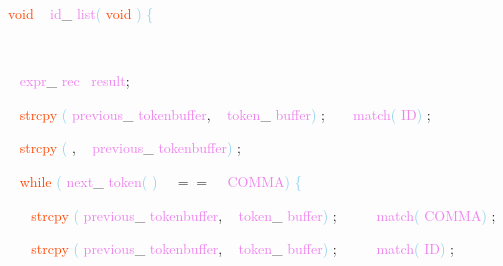\documentclass[8, usernames, dvipsnames]{beamer}
\begin{document}
\begin{frame}
\textcolor{OrangeRed}{void}
\textcolor{White}{\ }
\textcolor{Violet}{id}\textcolor{Sepia}{\_}
\textcolor{Violet}{list}\textcolor{SkyBlue}{(}
\textcolor{OrangeRed}{void}
\textcolor{SkyBlue}{)}
\textcolor{SkyBlue}{\{ }

 \textcolor{White}{\   }

 \textcolor{White}{\   }
\textcolor{Violet}{expr}\textcolor{Sepia}{\_}
\textcolor{Violet}{rec}\textcolor{White}{\ }
\textcolor{Violet}{result}\textcolor{Sepia}{;}

 \textcolor{White}{\   }
\textcolor{OrangeRed}{strcpy}
\textcolor{SkyBlue}{(}
\textcolor{Violet}{previous}\textcolor{Sepia}{\_}
\textcolor{Violet}{tokenbuffer}\textcolor{Sepia}{,}
\textcolor{White}{\ }
\textcolor{Violet}{token}\textcolor{Sepia}{\_}
\textcolor{Violet}{buffer}\textcolor{SkyBlue}{)}
\textcolor{Sepia}{;}
\textcolor{White}{\ }
\textcolor{White}{\   }
\textcolor{Violet}{match}\textcolor{SkyBlue}{(}
\textcolor{Violet}{ID}\textcolor{SkyBlue}{)}
\textcolor{Sepia}{;}

 \textcolor{White}{\   }
\textcolor{OrangeRed}{strcpy}
\textcolor{SkyBlue}{(}
\textcolor{Sepia}{,}
\textcolor{White}{\ }
\textcolor{Violet}{previous}\textcolor{Sepia}{\_}
\textcolor{Violet}{tokenbuffer}\textcolor{SkyBlue}{)}
\textcolor{Sepia}{;}

 \textcolor{White}{\   }
\textcolor{OrangeRed}{while}
\textcolor{SkyBlue}{(}
\textcolor{Violet}{next}\textcolor{Sepia}{\_}
\textcolor{Violet}{token}\textcolor{SkyBlue}{(}
\textcolor{SkyBlue}{)}
\textcolor{White}{\ }
\textcolor{OliveGreen}{$==$}
\textcolor{White}{\ }
\textcolor{Violet}{COMMA}\textcolor{SkyBlue}{)}
\textcolor{SkyBlue}{\{ }

 \textcolor{White}{\   }
\textcolor{White}{\   }
\textcolor{OrangeRed}{strcpy}
\textcolor{SkyBlue}{(}
\textcolor{Violet}{previous}\textcolor{Sepia}{\_}
\textcolor{Violet}{tokenbuffer}\textcolor{Sepia}{,}
\textcolor{White}{\ }
\textcolor{Violet}{token}\textcolor{Sepia}{\_}
\textcolor{Violet}{buffer}\textcolor{SkyBlue}{)}
\textcolor{Sepia}{;}
\textcolor{White}{\ }
\textcolor{White}{\   }
\textcolor{White}{\   }
\textcolor{Violet}{match}\textcolor{SkyBlue}{(}
\textcolor{Violet}{COMMA}\textcolor{SkyBlue}{)}
\textcolor{Sepia}{;}

 \textcolor{White}{\   }
\textcolor{White}{\   }
\textcolor{OrangeRed}{strcpy}
\textcolor{SkyBlue}{(}
\textcolor{Violet}{previous}\textcolor{Sepia}{\_}
\textcolor{Violet}{tokenbuffer}\textcolor{Sepia}{,}
\textcolor{White}{\ }
\textcolor{Violet}{token}\textcolor{Sepia}{\_}
\textcolor{Violet}{buffer}\textcolor{SkyBlue}{)}
\textcolor{Sepia}{;}
\textcolor{White}{\ }
\textcolor{White}{\   }
\textcolor{White}{\   }
\textcolor{Violet}{match}\textcolor{SkyBlue}{(}
\textcolor{Violet}{ID}\textcolor{SkyBlue}{)}
\textcolor{Sepia}{;}


\end{frame}
\end{document}
